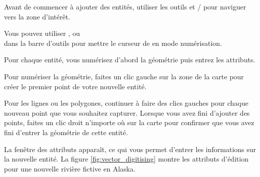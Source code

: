 
Avant de commencer à ajouter des entités, utiliser les outils  et / pour naviguer vers la zone d'intérêt.

Vous pouvez utiliser ,  ou\\  dans la barre d'outils pour mettre le curseur de \qg en mode numérisation.

Pour chaque entité, vous numérisez d'abord la géométrie puis entrez les attributs.

Pour numériser la géométrie, faites un clic gauche sur la zone de la carte pour créer le premier point de votre nouvelle entité.

Pour les lignes ou les polygones, continuer à faire des clics gauches pour chaque nouveau point que vous souhaitez capturer. Lorsque vous avez fini d'ajouter des points, faites un clic droit n'importe où sur la carte pour confirmer que vous avez fini d'entrer la géométrie de cette entité.

La fenêtre des attributs apparaît, ce qui vous permet d'entrer les informations sur la nouvelle entité. La figure \ref{fig:vector_digitising} montre les attributs d'édition pour une nouvelle rivière fictive en Alaska.


